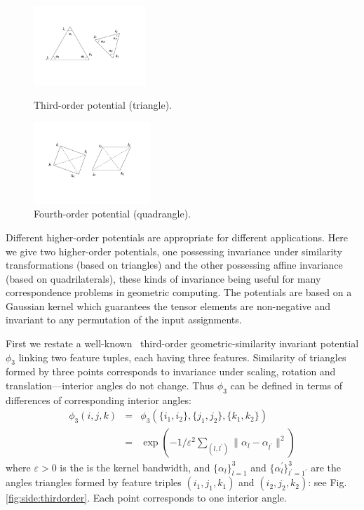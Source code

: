 \begin{figure}[!ht]
\setlength{\abovecaptionskip}{0mm}
\setlength{\belowcaptionskip}{2mm}
 \begin{minipage}[!ht]{0.5\linewidth}
  \centering
  \includegraphics[height=30mm]{thirdorderpotentials.pdf}
  \caption{Third-order potential (triangle).}
  \label{fig:side:thirdorder}
 \end{minipage}%
 \begin{minipage}[!ht]{0.5\linewidth}
  \centering
  \includegraphics[height=31mm]{fourthorderpotentials.pdf}
  \caption{Fourth-order potential (quadrangle).}
  \label{fig:side:fourthorder}
 \end{minipage}
 \vspace{-4ex}
\end{figure}

Different higher-order potentials are appropriate for different applications.
Here we give two higher-order potentials, one possessing invariance under similarity transformations (based on triangles) and the other possessing affine invariance (based on quadrilaterals), these kinds of
invariance being useful for many correspondence problems in geometric computing.
The potentials are based on a Gaussian kernel which guarantees the tensor elements are non-negative and invariant to any permutation of the input assignments.

First we restate a well-known~\cite{Duchenne_etal09,Chertok10} third-order geometric-similarity invariant potential $\phi_3$ linking two feature tuples, each having three features.
Similarity of triangles formed by three points corresponds to invariance under scaling, rotation and translation---interior angles do not change.
Thus $\phi_3$ can be defined in terms of differences of corresponding interior angles:
%
\begin{eqnarray}
\phi_3(i,j,k)&=&\phi_3(\{i_1,i_2\}, \{j_1,j_2\}, \{k_1,k_2\})\nonumber\\
&=&\exp(-1/\varepsilon^2\sum\nolimits_{(l,l^{'})}\lVert \alpha_l- \alpha_{l^{'} } \lVert^2 )
\end{eqnarray}
where $\varepsilon > 0$ is the is the kernel bandwidth, and $\{\alpha_l\}_{l=1}^3$  and $\{\alpha_l^{'}\}_{l^{'}=1^{'}}^{3}$ are the angles triangles formed by feature triples $(i_1,j_1,k_1)$ and $(i_2,j_2,k_2)$: see Fig.\ref{fig:side:thirdorder}. Each point corresponds to one interior angle.
%

